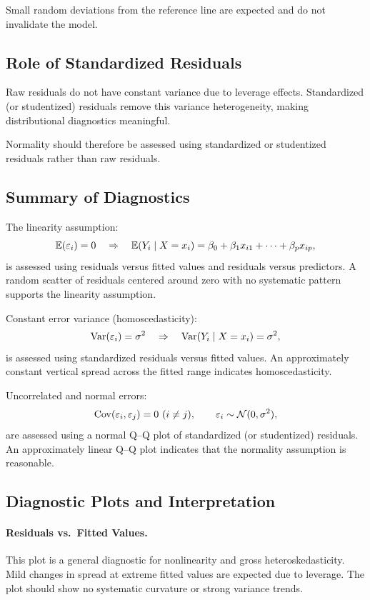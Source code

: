 Small random deviations from the reference line are expected and do not invalidate the model.

\subsection{Role of Standardized Residuals}

Raw residuals do not have constant variance due to leverage effects. Standardized (or studentized) residuals remove this variance heterogeneity, making distributional diagnostics meaningful.

Normality should therefore be assessed using standardized or studentized residuals rather than raw residuals.

\subsection{Summary of Diagnostics}

The linearity assumption:
\[
\mathbb{E}(\varepsilon_i)=0 \quad \Rightarrow \quad \mathbb{E}(Y_i \mid X=x_i)=\beta_0+\beta_1 x_{i1}+\cdots+\beta_p x_{ip},
\]
is assessed using residuals versus fitted values and residuals versus predictors. A random scatter of residuals centered around zero with no systematic pattern supports the linearity assumption.

Constant error variance (homoscedasticity):
\[
\operatorname{Var}(\varepsilon_i)=\sigma^2 \quad \Rightarrow \quad \operatorname{Var}(Y_i \mid X=x_i)=\sigma^2,
\]
is assessed using standardized residuals versus fitted values. An approximately constant vertical spread across the fitted range indicates homoscedasticity.

Uncorrelated and normal errors:
\[
\operatorname{Cov}(\varepsilon_i,\varepsilon_j)=0 \ (i\neq j),
\qquad \varepsilon_i \sim \mathcal{N}(0,\sigma^2),
\]
are assessed using a normal Q--Q plot of standardized (or studentized) residuals. An approximately linear Q--Q plot indicates that the normality assumption is reasonable.

\subsection{Diagnostic Plots and Interpretation}

\paragraph{Residuals vs.\ Fitted Values.}
This plot is a general diagnostic for nonlinearity and gross heteroskedasticity. Mild changes in spread at extreme fitted values are expected due to leverage. The plot should show no systematic curvature or strong variance trends.

